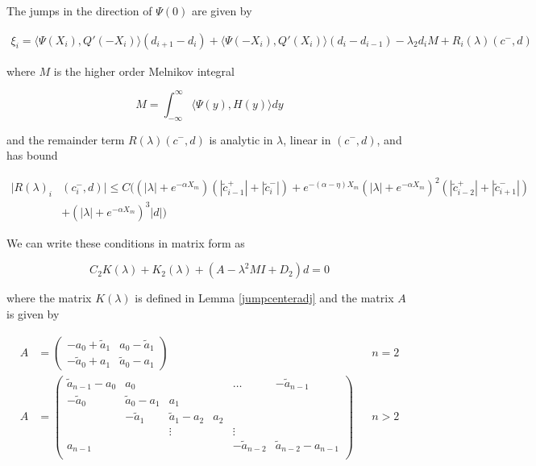 \documentclass[thesis.tex]{subfiles}
\begin{document}
\begin{lemma}\label{jumpadj}

The jumps in the direction of $\Psi(0)$ are given by

\begin{align}\label{xi}
\xi_i = \langle \Psi(X_i), Q'(-X_i) \rangle (d_{i+1} - d_i)
+ \langle \Psi(-X_i), Q'(X_i) \rangle (d_i - d_{i-1})
- \lambda_2 d_i M + R_i(\lambda)(c^-, d)
\end{align}

where $M$ is the higher order Melnikov integral

\begin{equation}\label{M}
M = \int_{-\infty}^\infty \langle \Psi(y), H(y) \rangle dy 
\end{equation}

and the remainder term $R(\lambda)(c^-, d)$ is analytic in $\lambda$, linear in $(c^-, d)$, and has bound

\begin{align}\label{R}
|R(\lambda)_i&(c_i^-, d)| \leq C \Big( (|\lambda| + e^{-\alpha X_m})(|\tilde{c}_{i-1}^+| + |\tilde{c}_{i}^-|) + e^{-(\alpha - \eta) X_m}(|\lambda| + e^{-\alpha X_m})^2(|\tilde{c}_{i-2}^+| + |\tilde{c}_{i+1}^-|) \\
&+ (|\lambda| + e^{-\alpha X_m})^3 |d| \Big) \nonumber
\end{align}

We can write these conditions in matrix form as

\begin{equation}
C_2 K(\lambda) + K_2(\lambda) + (A - \lambda^2 M I + D_2)d = 0
\end{equation}

where the matrix $K(\lambda)$ is defined in Lemma \ref{jumpcenteradj} and the matrix $A$ is given by

\begin{align*}
A &= \begin{pmatrix}
-a_0 + \tilde{a}_1 & a_0 - \tilde{a}_1 \\
-\tilde{a}_0 + a_1 & \tilde{a}_0 - a_1
\end{pmatrix} && n = 2 \\
A &= \begin{pmatrix}
\tilde{a}_{n-1} - a_0 & a_0 & & & \dots & -\tilde{a}_{n-1}\\
-\tilde{a}_0 & \tilde{a}_0 - a_1 &  a_1 \\
& -\tilde{a}_1 & \tilde{a}_1 - a_2 &  a_2 \\
& & \vdots & & \vdots \\
a_{n-1} & & & & -\tilde{a}_{n-2} & \tilde{a}_{n-2} - a_{n-1} \\
\end{pmatrix} && n > 2
\end{align*}


\end{lemma}
\end{document}

